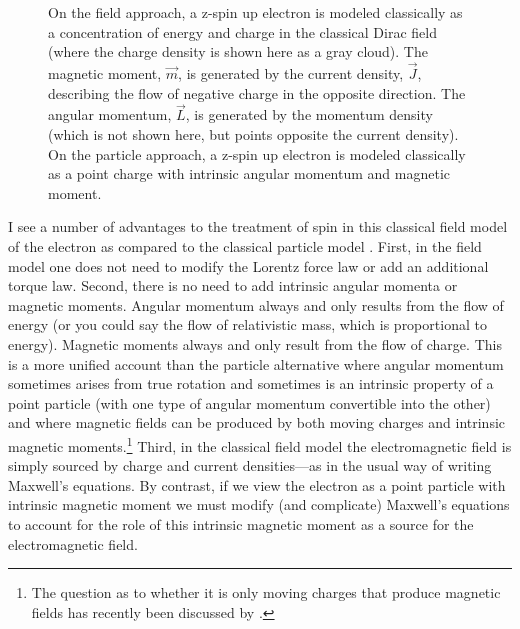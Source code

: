 \documentclass[12pt,onecolumn,secnumarabic,amsmath,amssymb,balancelastpage,nofootinbib]{article}
\begin{document}
\begin{figure}[htb]
\caption{On the field approach, a z-spin up electron is modeled classically as a concentration of energy and charge in the classical Dirac field (where the charge density is shown here as a gray cloud).  The magnetic moment, $\vec{m}$, is generated by the current density, $\vec{J}$, describing the flow of negative charge in the opposite direction.  The angular momentum, $\vec{L}$, is generated by the momentum density (which is not shown here, but points opposite the current density).  On the particle approach, a z-spin up electron is modeled classically as a point charge with intrinsic angular momentum and magnetic moment.}
  \label{spinfigure}
\end{figure}


I see a number of advantages to the treatment of spin in this classical field model of the electron as compared to the classical particle model \citep[sec.\ 6]{spinmeasurement}.  First, in the field model one does not need to modify the Lorentz force law or add an additional torque law.  Second, there is no need to add intrinsic angular momenta or magnetic moments.  Angular momentum always and only results from the flow of energy (or you could say the flow of relativistic mass, which is proportional to energy).  Magnetic moments always and only result from the flow of charge.  This is a more unified account than the particle alternative where angular momentum sometimes arises from true rotation and sometimes is an intrinsic property of a point particle (with one type of angular momentum convertible into the other) and where magnetic fields can be produced by both moving charges and intrinsic magnetic moments.\footnote{The question as to whether it is only moving charges that produce magnetic fields has recently been discussed by \citet{fahy2022, griffiths2022}.}  Third, in the classical field model the electromagnetic field is simply sourced by charge and current densities---as in the usual way of writing Maxwell's equations.  By contrast, if we view the electron as a point particle with intrinsic magnetic moment we must modify (and complicate) Maxwell's equations to account for the role of this intrinsic magnetic moment as a source for the electromagnetic field.
\end{document}
